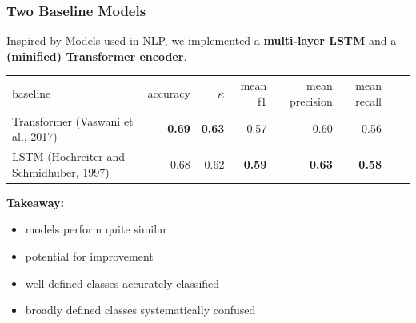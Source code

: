 \begin{frame}
\frametitle{Two Baseline Models}

\Large
Inspired by Models used in NLP, we implemented a \textbf{multi-layer LSTM} and a \textbf{(minified) Transformer encoder}.

\vspace{1em}
\normalsize

\begin{tabular}{lrrrrrrr}
\toprule
baseline & accuracy & $\kappa$ & mean f1 & mean precision  & mean recall \\
\cmidrule(lr){1-1}\cmidrule(lr){2-2}\cmidrule(lr){3-3}\cmidrule(lr){4-4}\cmidrule(lr){5-5}\cmidrule(lr){6-6}\cmidrule(lr){7-7}
Transformer {\small (Vaswani et al., 2017)} & \textbf{0.69}  &  \textbf{0.63} & 0.57 & {0.60} & 0.56 \\
LSTM {\small (Hochreiter and Schmidhuber, 1997)} & 0.68 & 0.62 & \textbf{0.59} & \textbf{0.63} & \textbf{0.58} \\
\bottomrule
\end{tabular}

\vspace{1em}

\Large
\textbf{Takeaway:} 
\begin{itemize}
\item models perform quite similar
\item potential for improvement
\item well-defined classes accurately classified
\item broadly defined classes systematically confused
\end{itemize}

\end{frame}

